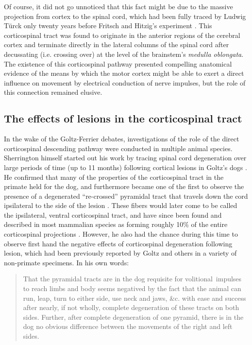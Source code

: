 Of course, it did not go unnoticed that this fact might be due to the massive projection from cortex to the spinal cord, which had been fully traced by Ludwig Türck only twenty years before Fritsch and Hitzig's experiment \citep{Nathan1955}. This corticospinal tract was found to originate in the anterior regions of the cerebral cortex and terminate directly in the lateral columns of the spinal cord after decussating (i.e. crossing over) at the level of the brainstem's \emph{medulla oblongata}. The existence of this corticospinal pathway presented compelling anatomical evidence of the means by which the motor cortex might be able to exert a direct influence on movement by electrical conduction of nerve impulses, but the role of this connection remained elusive.

\subsection{The effects of lesions in the corticospinal tract}

In the wake of the Goltz-Ferrier debates, investigations of the role of the direct corticospinal descending pathway were conducted in multiple animal species. Sherrington himself started out his work by tracing spinal cord degeneration over large periods of time (up to 11 months) following cortical lesions in Goltz's dogs \citep{Langley1884,Sherrington1885}. He confirmed that many of the properties of the corticospinal tract in the primate held for the dog, and furthermore became one of the first to observe the presence of a degenerated ``re-crossed'' pyramidal tract that travels down the cord ipsilateral to the side of the lesion \citep{Sherrington1885}. These fibers would later come to be called the ipsilateral, ventral corticospinal tract, and have since been found and described in most mammalian species as forming roughly 10\% of the entire corticospinal projections \citep{Kuypers1981,Brosamle2000,Lacroix2004}. However, he also had the chance during this time to observe first hand the negative effects of corticospinal degeneration following lesion, which had been previously reported by Goltz and others in a variety of non-primate specimens. In his own words:

\blockquote[{\protect\cite[p.189]{Sherrington1885}}]{That the pyramidal tracts are in the dog requisite for volitional~impulses to reach limbs and body seems negatived by the fact that the animal can run, leap, turn to either side, use neck and jaws, \&c. with ease and success after nearly, if not wholly, complete degeneration of these tracts on both sides. Further, after complete degeneration of one pyramid, there is in the dog no obvious difference between the movements of the right and left sides.}

